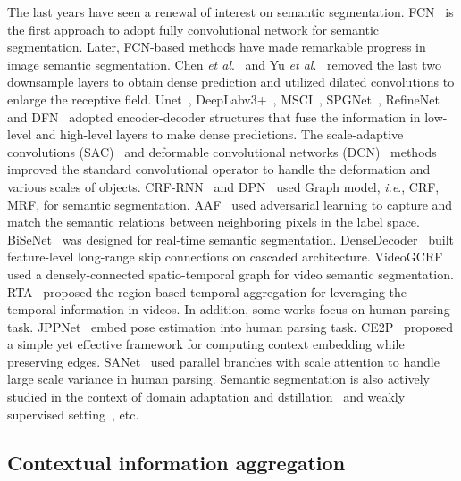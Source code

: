 \documentclass[10pt,journal,compsoc]{IEEEtran}
\def\ie{\emph{i.e}.} \def\Ie{\emph{I.e}.}
\def\etal{\emph{et al}.}
\begin{document}
The last years have seen a renewal of interest on semantic segmentation. FCN~\cite{long2015fully} is the first approach to adopt fully convolutional network for semantic segmentation. Later, FCN-based methods have made remarkable progress in image semantic segmentation. Chen \etal~\cite{chen2014semantic} and Yu \etal~\cite{yu2015multi} removed the last two downsample layers to obtain dense prediction and utilized dilated convolutions to enlarge the receptive field. Unet~\cite{ronneberger2015u}, DeepLabv3+~\cite{chen2018encoder}, MSCI~\cite{lin2018multi}, SPGNet~\cite{chen2019spgnet}, RefineNet~\cite{lin2017refinenet} and DFN~\cite{yu2018learning} adopted encoder-decoder structures that fuse the information in low-level and high-level layers to make dense predictions. The scale-adaptive convolutions (SAC)~\cite{zhang2017scale} and deformable convolutional networks (DCN)~\cite{dai2017deformable} methods improved the standard convolutional operator to handle the deformation and various scales of objects. CRF-RNN~\cite{yu2015multi} and DPN~\cite{liu2015semantic} used Graph model, \ie, CRF, MRF, for semantic segmentation. AAF~\cite{ke2018adaptive} used adversarial learning to capture and match the semantic relations between neighboring pixels in the label space. BiSeNet~\cite{yu2018bisenet} was designed for real-time semantic segmentation. DenseDecoder~\cite{bilinski2018dense} built feature-level long-range skip connections on cascaded architecture. VideoGCRF~\cite{chandra2018deep} used a densely-connected spatio-temporal graph for video semantic segmentation. RTA~\cite{huang2018efficient} proposed the region-based temporal aggregation for leveraging the temporal information in videos. In addition, some works focus on human parsing task. JPPNet~\cite{liang2018look} embed pose estimation into human parsing task. CE2P~\cite{ruan2019devil} proposed a simple yet effective framework for computing context embedding while preserving edges. SANet~\cite{huang2019sanet} used parallel branches with scale attention to handle large scale variance in human parsing. 
Semantic segmentation is also actively studied in the context of domain adaptation and dstillation~\cite{wang2020differential, wang2020alleviating, jiao2019geometry} and weakly supervised setting~\cite{huang2018weakly,wei2018revisiting,qian2019weakly}, etc.

\subsection{Contextual information aggregation}
\end{document}
